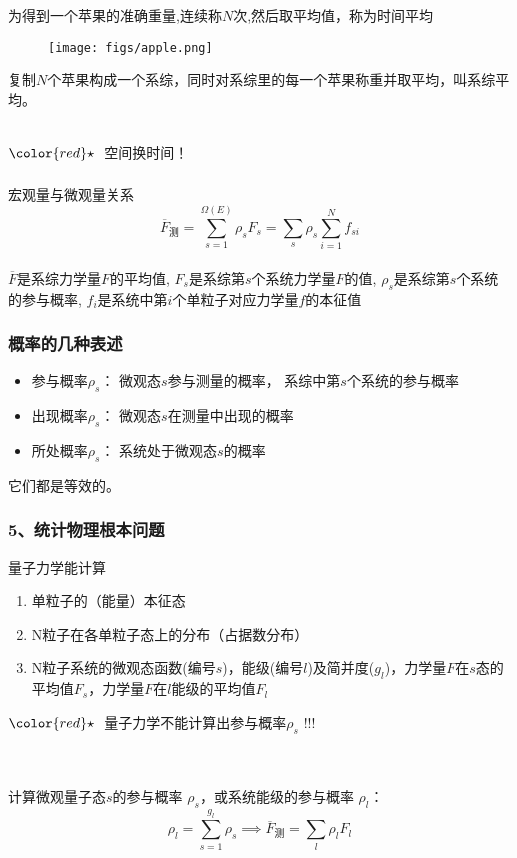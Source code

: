 \begin{frame}
 \frametitle{}
为得到一个苹果的准确重量,连续称$N$次,然后取平均值，称为时间平均\\
\begin{figure}[htbp]
 \centering
 \texttt{[image: figs/apple.png]}
\end{figure}
复制$N$个苹果构成一个系综，同时对系综里的每一个苹果称重并取平均，叫系综平均。

~~\\
${\color{red}\star}~$ 空间换时间！
\end{frame} 

\begin{frame}[label=current]
  \frametitle{}
  宏观量与微观量关系
  \[ \overline{F}_{\text{测}} = \sum _{s=1}^{\Omega(E)} \rho _s F_s = \sum _{s} \rho _s \sum _{i=1}^N f_{si} \]
  ~~\\ 
  \emf[系综表述：] $\overline{F}$是系综力学量$F$的平均值, $F_s$是系综第$s$个系统力学量$F$的值, $\rho _s$是系综第$s$个系统的参与概率, $f_i$是系统中第$i$个单粒子对应力学量$f$的本征值
\end{frame} 

\begin{frame}
  \frametitle{概率的几种表述}
  \begin{itemize}
    \item 参与概率$\rho _s$： 微观态$s$参与测量的概率， 系综中第$s$个系统的参与概率
    \item 出现概率$\rho _s$： 微观态$s$在测量中出现的概率
    \item 所处概率$\rho _s$： 系统处于微观态$s$的概率
  \end{itemize}
  它们都是等效的。
\end{frame} 

\begin{frame}
  \frametitle{ 5、统计物理根本问题}
  量子力学能计算
  \begin{enumerate}
    \item 单粒子的（能量）本征态
    \item N粒子在各单粒子态上的分布（占据数分布）
    \item N粒子系统的微观态函数(编号$s$)，能级(编号$l$)及简并度($g_l$)，力学量$F$在$s$态的平均值$F_s$，力学量$F$在$l$能级的平均值$F_l$ 
  \end{enumerate}
  ${\color{red}\star}~$ 量子力学不能计算出参与概率$\rho _s$ !!!
    
  ~~\\ 
  \emf[统计物理的第一要务:]  \\
  计算微观量子态$s$的参与概率 $\rho _s$，或系统能级的参与概率 $\rho _l$： $$ \rho _l = \sum_{s=1}^{g_l} \rho _s \implies \overline{F}_{\text{测}} = \sum _{l} \rho _l F_l $$
\end{frame} 

